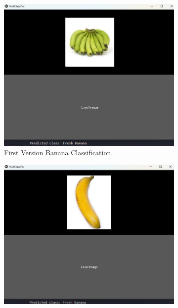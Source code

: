 \documentclass[conference]{IEEEtran}
\begin{document}
\begin{figure}[h]
\begin{subfigure}[b]{0.48\linewidth}
        \label{figFA}
    \end{subfigure}
    \hfill
    \begin{subfigure}[b]{0.48\linewidth}
        \centering
        \includegraphics[width=\linewidth]{1layer banana2.png}
        \caption{First Version Banana Classification.}
        \label{figFB}
    \end{subfigure}
    \hfill
    \begin{subfigure}[b]{0.48\linewidth}
        \centering
        \includegraphics[width=\linewidth]{1layer banana3.png}

\end{subfigure}
\end{figure}
\end{document}
